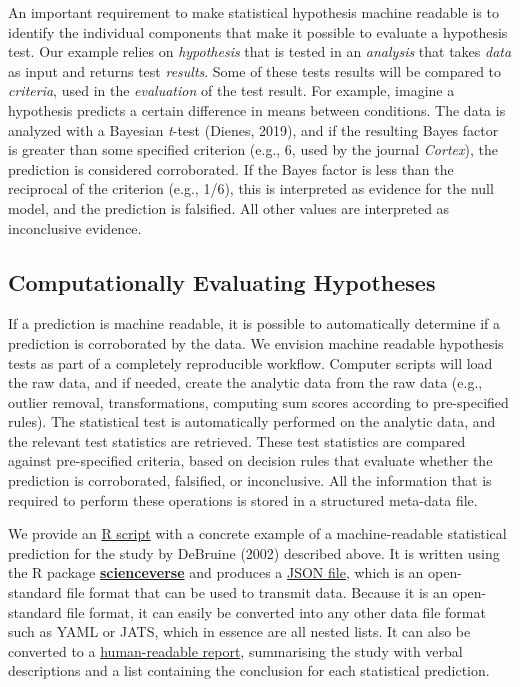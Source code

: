 \documentclass[english,doc,floatsintext]{apa6}
\begin{document}
An important requirement to make statistical hypothesis machine readable is to identify the individual components that make it possible to evaluate a hypothesis test. Our example relies on \emph{hypothesis} that is tested in an \emph{analysis} that takes \emph{data} as input and returns test \emph{results}. Some of these tests results will be compared to \emph{criteria}, used in the \emph{evaluation} of the test result. For example, imagine a hypothesis predicts a certain difference in means between conditions. The data is analyzed with a Bayesian \emph{t}-test (Dienes, 2019), and if the resulting Bayes factor is greater than some specified criterion (e.g., 6, used by the journal \emph{Cortex}), the prediction is considered corroborated. If the Bayes factor is less than the reciprocal of the criterion (e.g., 1/6), this is interpreted as evidence for the null model, and the prediction is falsified. All other values are interpreted as inconclusive evidence.

\hypertarget{computationally-evaluating-hypotheses}{%
\subsection{Computationally Evaluating Hypotheses}\label{computationally-evaluating-hypotheses}}

If a prediction is machine readable, it is possible to automatically determine if a prediction is corroborated by the data. We envision machine readable hypothesis tests as part of a completely reproducible workflow. Computer scripts will load the raw data, and if needed, create the analytic data from the raw data (e.g., outlier removal, transformations, computing sum scores according to pre-specified rules). The statistical test is automatically performed on the analytic data, and the relevant test statistics are retrieved. These test statistics are compared against pre-specified criteria, based on decision rules that evaluate whether the prediction is corroborated, falsified, or inconclusive. All the information that is required to perform these operations is stored in a structured meta-data file.

We provide an \href{example/example.Rmd}{R script} with a concrete example of a machine-readable statistical prediction for the study by DeBruine (2002) described above. It is written using the R package \href{https://scienceverse.github.io/scienceverse/}{\textbf{scienceverse}} and produces a \href{example/postreg.json}{JSON file}, which is an open-standard file format that can be used to transmit data. Because it is an open-standard file format, it can easily be converted into any other data file format such as YAML or JATS, which in essence are all nested lists. It can also be converted to a \href{example/postreg.html}{human-readable report}, summarising the study with verbal descriptions and a list containing the conclusion for each statistical prediction.
\end{document}
